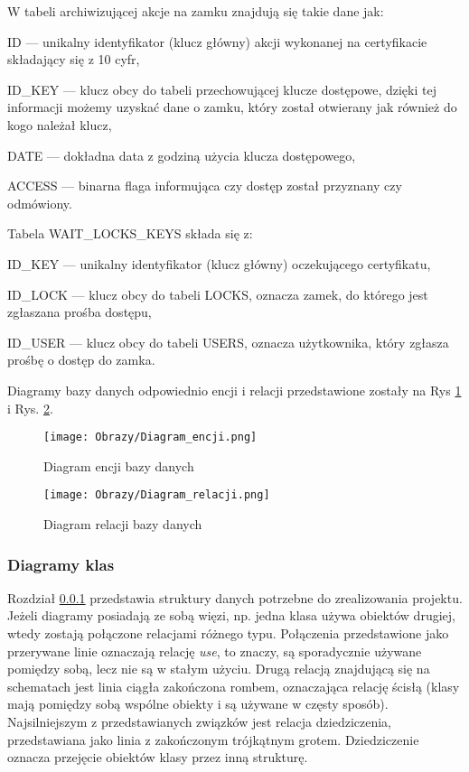 \documentclass[twoside,10pt]{article}
\begin{document}
W tabeli archiwizującej akcje na zamku znajdują się takie dane jak:
\begin{itemize*}
\item {ID} --- unikalny identyfikator (klucz główny) akcji wykonanej na certyfikacie składający się z 10 cyfr,
\item {ID\_KEY} --- klucz obcy do tabeli przechowującej klucze dostępowe, dzięki tej informacji możemy uzyskać dane o zamku, który został otwierany jak również do kogo należał klucz,
\item {DATE} --- dokładna data z godziną użycia klucza dostępowego,
\item {ACCESS} --- binarna flaga informująca czy dostęp został przyznany czy odmówiony.
\end{itemize*}

Tabela WAIT\_LOCKS\_KEYS składa się z:
\begin{itemize*}
\item {ID\_KEY} --- unikalny identyfikator (klucz główny) oczekującego certyfikatu,
\item{ID\_LOCK} --- klucz obcy do tabeli LOCKS, oznacza zamek, do którego jest zgłaszana prośba dostępu,
\item {ID\_USER} --- klucz obcy do tabeli USERS, oznacza użytkownika, który zgłasza prośbę o dostęp do zamka.
\end{itemize*}

Diagramy bazy danych odpowiednio encji i relacji przedstawione zostały na Rys \ref{diagram:diagram encji} i Rys. \ref{diagram:diagram relacji}\cite{BD}.  

\begin{figure}[!h]
\centering
\texttt{[image: Obrazy/Diagram\_encji.png]}
\caption{Diagram encji bazy danych}
\label{diagram:diagram encji}
\end{figure}
\newpage
\begin{figure}[!h]
\centering
\texttt{[image: Obrazy/Diagram\_relacji.png]}
\caption{Diagram relacji bazy danych}
\label{diagram:diagram relacji}
\end{figure}
\newpage

\subsubsection{Diagramy klas}\label{sec:diagramy klas}
Rozdział \ref{sec:diagramy klas} przedstawia struktury danych potrzebne do zrealizowania projektu. Jeżeli diagramy posiadają ze sobą więzi, np. jedna klasa używa obiektów drugiej, wtedy zostają połączone relacjami różnego typu. Połączenia przedstawione jako przerywane linie oznaczają relację \textit{use}, to znaczy, są sporadycznie używane pomiędzy sobą, lecz nie są w stałym użyciu. Drugą relacją znajdującą się na schematach jest linia ciągła zakończona rombem, oznaczająca relację ścisłą (klasy mają pomiędzy sobą wspólne obiekty i są używane w częsty sposób). Najsilniejszym z przedstawianych związków jest relacja dziedziczenia, przedstawiana jako linia z zakończonym trójkątnym grotem. Dziedziczenie oznacza przejęcie obiektów klasy przez inną strukturę.
\end{document}
